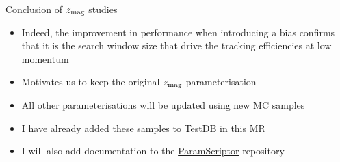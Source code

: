 \documentclass[xcolor={dvipsnames}]{beamer}
\begin{document}
\begin{frame}{Conclusion of $z_{\rm mag}$ studies}
  \vspace{0.0cm}
  \begin{itemize}
    \setlength\itemsep{1.0em}
    \item{Indeed, the improvement in performance when introducing a bias confirms that it is the search window size that drive the tracking efficiencies at low momentum}
    \item{Motivates us to keep the original $z_{\rm mag}$ parameterisation}
    \item{All other parameterisations will be updated using new MC samples}
    \item{I have already added these samples to TestDB in \href{https://gitlab.cern.ch/lhcb-datapkg/PRConfig/-/merge_requests/567}{this MR}}
    \item{I will also add documentation to the \href{https://gitlab.cern.ch/lhcb/paramscriptor}{ParamScriptor} repository}
  \end{itemize}
\end{frame}
\end{document}
